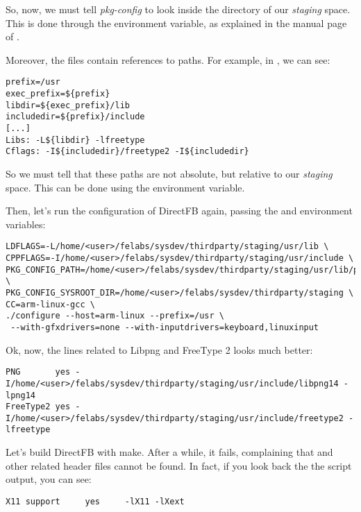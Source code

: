 So, now, we must tell {\em pkg-config} to look inside the
 directory of our {\em staging} space. This
is done through the  environment variable, as
explained in the manual page of .

Moreover, the  files contain references to paths. For
example, in
,
we can see:

\begin{verbatim}
prefix=/usr
exec_prefix=${prefix}
libdir=${exec_prefix}/lib
includedir=${prefix}/include
[...]
Libs: -L${libdir} -lfreetype
Cflags: -I${includedir}/freetype2 -I${includedir}
\end{verbatim}

So we must tell  that these paths are not absolute,
but relative to our {\em staging} space. This can be done using the
 environment variable.

Then, let's run the configuration of DirectFB again, passing the
 and  environment
variables:

\small
\begin{verbatim}
LDFLAGS=-L/home/<user>/felabs/sysdev/thirdparty/staging/usr/lib \
CPPFLAGS=-I/home/<user>/felabs/sysdev/thirdparty/staging/usr/include \
PKG_CONFIG_PATH=/home/<user>/felabs/sysdev/thirdparty/staging/usr/lib/pkgconfig \
PKG_CONFIG_SYSROOT_DIR=/home/<user>/felabs/sysdev/thirdparty/staging \
CC=arm-linux-gcc \
./configure --host=arm-linux --prefix=/usr \
 --with-gfxdrivers=none --with-inputdrivers=keyboard,linuxinput
\end{verbatim}
\normalsize

Ok, now, the lines related to Libpng and FreeType 2 looks much better:

\footnotesize
\begin{verbatim}
PNG       yes -I/home/<user>/felabs/sysdev/thirdparty/staging/usr/include/libpng14 -lpng14
FreeType2 yes -I/home/<user>/felabs/sysdev/thirdparty/staging/usr/include/freetype2 -lfreetype
\end{verbatim}
\normalsize

Let's build DirectFB with make. After a while, it fails, complaining
that \code{X11/Xlib.h} and other related header files cannot be
found. In fact, if you look back the the \code{./configure} script
output, you can see:

\begin{verbatim}
X11 support		yes		-lX11 -lXext
\end{verbatim}

